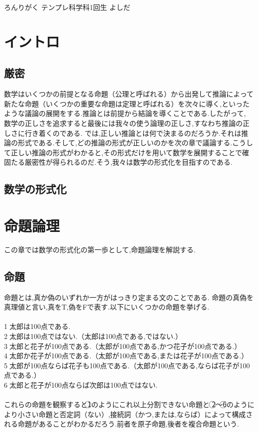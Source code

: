 \documentclass[10pt,b5paper,papersize,dvipdfmx]{jsbook}
\begin{document}
\kaishititle%
  {ろんりがく}%
  {テンプレ科学科1回生}%
  {よしだ}%

\section{イントロ}
\subsection{厳密}
数学はいくつかの前提となる命題（公理と呼ばれる）から出発して推論によって新たな命題（いくつかの重要な命題は定理と呼ばれる）を次々に導く,といったような議論の展開をする.推論とは前提から結論を導くことである.したがって,
数学の正しさを追求すると最後には我々の使う論理の正しさ,すなわち推論の正しさに行き着くのである.
では,正しい推論とは何で決まるのだろうか.それは推論の形式である.そして,どの推論の形式が正しいのかを次の章で議論する.こうして正しい推論の形式がわかると,その形式だけを用いて数学を展開することで確固たる厳密性が得られるのだ.そう,我々は数学の形式化を目指すのである.

\subsection{数学の形式化}

\section{命題論理}
この章では数学の形式化の第一歩として,命題論理を解説する.
\subsection{命題}
命題とは,真か偽のいずれか一方がはっきり定まる文のことである.
命題の真偽を真理値と言い,真をT,偽をFで表す.以下にいくつかの命題を挙げる.\\
\\
\textcircled{\scriptsize 1}太郎は100点である.\\
\textcircled{\scriptsize 2}太郎は100点ではない.（太郎は100点である,ではない.）\\
\textcircled{\scriptsize 3}太郎と花子が100点である.（太郎が100点である,かつ花子が100点である.）\\
\textcircled{\scriptsize 4}太郎か花子が100点である.（太郎が100点である,または花子が100点である.）\\
\textcircled{\scriptsize 5}太郎が100点ならば花子も100点である.（太郎が100点である,ならば花子が100点である.）\\
\textcircled{\scriptsize 6}太郎と花子が100点ならば次郎は100点ではない.\\
\\
これらの命題を観察すると\textcircled{\scriptsize 1}のようにこれ以上分割できない命題と
\textcircled{\scriptsize 2}～\textcircled{\scriptsize 6}のようにより小さい命題と否定詞（ない）,接続詞（かつ,または,ならば）によって構成される命題があることがわかるだろう.前者を原子命題,後者を複合命題という.
\end{document}
